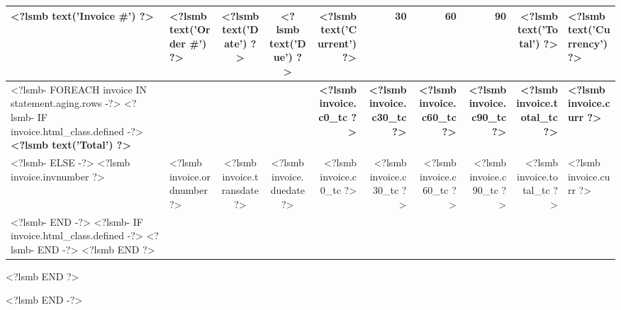 \begin{tabular*}{\textwidth}{|ll@{\extracolsep\fill}ccrrrrrl|}
  \hline
  \textbf{<?lsmb text('Invoice #') ?>} & \textbf{<?lsmb text('Order #') ?>}
  & \textbf{<?lsmb text('Date') ?>} & \textbf{<?lsmb text('Due') ?>} &
  \textbf{<?lsmb text('Current') ?>} & \textbf{30} & \textbf{60} & \textbf{90} &
   \textbf{<?lsmb text('Total') ?>} & \textbf{<?lsmb text('Currency') ?>} \\
  \hline
  <?lsmb- FOREACH invoice IN statement.aging.rows -?>
  <?lsmb- IF invoice.html_class.defined -?>
  \textbf{<?lsmb text('Total') ?>} &
  & & &
  \textbf{<?lsmb invoice.c0_tc ?>} &
  \textbf{<?lsmb invoice.c30_tc ?>} &
  \textbf{<?lsmb invoice.c60_tc ?>} &
  \textbf{<?lsmb invoice.c90_tc ?>} &
  \textbf{<?lsmb invoice.total_tc ?>} &
  \textbf{<?lsmb invoice.curr ?>} \\
  <?lsmb- ELSE -?>
  <?lsmb invoice.invnumber ?> &
  <?lsmb invoice.ordnumber ?> &
  <?lsmb invoice.transdate ?> &
  <?lsmb invoice.duedate ?> &
  <?lsmb invoice.c0_tc ?> &
  <?lsmb invoice.c30_tc ?> &
  <?lsmb invoice.c60_tc ?> &
  <?lsmb invoice.c90_tc ?> &
  <?lsmb invoice.total_tc ?> &
  <?lsmb invoice.curr ?> \\
  <?lsmb- END -?>
  <?lsmb- IF invoice.html_class.defined -?>
  \hline
  <?lsmb- END -?>
<?lsmb END ?>
\end{tabular*}

\vspace{0.5cm}

\hfill
\pagebreak
<?lsmb END ?>

<?lsmb END -?>

